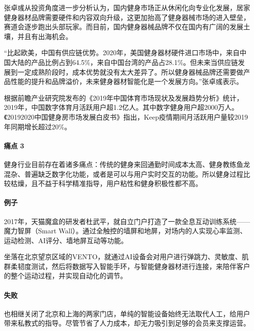 \documentclass[letterpaper,11pt,english]{sphinxmanual}
\begin{document}
张卓彧从投资角度进一步分析认为，国内健身市场正从休闲化向专业化发展，居家健身器材品牌需要硬件和内容双向升级，这更加抬高了健身器械市场的进入壁垒，赛道会逐步跑出头部玩家。而目前，国内健身器械品牌不仅在国内有广阔的发展土壤，并且有出海机会。

“比起欧美，中国有供应链优势。2020年，美国健身器材硬件进口市场中，来自中国大陆的产品比例占到64.5\%，来自中国台湾的产品占28.1\%。但未来当供应链发展到一定成熟阶段时，成本优势就没有太大差异了。所以健身器械品牌还需要做产品性能的提升和品牌溢价，未来健身器材智能化是一个发展方向。”张卓彧表示。

根据前瞻产业研究院发布的《2019年中国体育市场现状及发展趋势分析》统计，2019年，中国数字体育月活跃用户超1.2亿人。其中数字健身用户超2000万人。《2019\sphinxhyphen{}2020中国健身房市场发展白皮书》指出，Keep疫情期间月活跃用户量较2019年同期增长超过20\%。


\paragraph{痛点 3\sphinxfootnotemark[683]}
\label{\detokenize{chapter_project/AI_fit:id2}}%
\begin{footnotetext}[683]\sphinxAtStartFootnote
{}
%
\end{footnotetext}\ignorespaces 
健身行业目前存在着诸多痛点：传统的健身来回通勤时间成本太高、健身教练鱼龙混杂、普遍缺乏数字化功能，或者是可以与用户实时交互的功能。所以健身过程比较枯燥，且不益于科学精准指导，用户粘性和健身积极性都不高。


\paragraph{例子}
\label{\detokenize{chapter_project/AI_fit:id3}}
2017年，天猫魔盒的研发者杜武平，就自立门户打造了一款全息互动训练系统——魔力智屏（Smart
Wall）。通过全触控的墙屏和地屏，对场内的人实现心率监测、运动检测、AI评分、墙地屏互动等功能。

坐落在北京望京区域的VENTO，就通过AI设备会对用户进行弹跳力、灵敏度、肌群柔韧度测试，然后将数据写入智能手环，与智能健身器材进行连接，来陪伴客户的整个运动过程，并实现自动化的调节。


\paragraph{失败}
\label{\detokenize{chapter_project/AI_fit:id4}}
也相继关闭了北京和上海的两家门店，单纯的智能设备始终无法取代人工，给用户带来私教式的指导。尽管节省了人力成本，却无力吸引到足够的会员来支撑运营。
\end{document}
